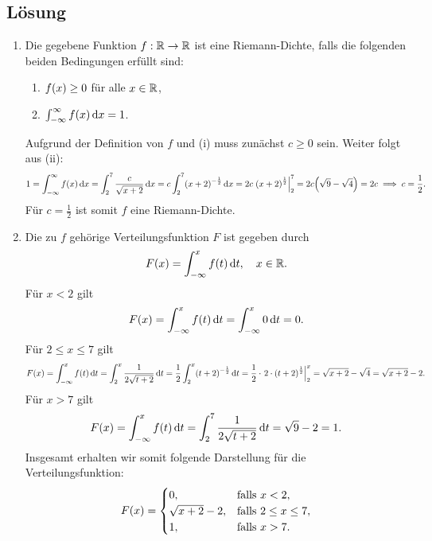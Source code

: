\documentclass{exercise}
\begin{document}
    \subsection*{Lösung}
    \begin{enumerate}
        \item Die gegebene Funktion \(f: \mathbb{R} \to \mathbb{R}\) ist eine Riemann-Dichte, falls die folgenden beiden Bedingungen erfüllt sind:
        \begin{enumerate}
            \item \(f\parentheses*{x} \ge 0\) für alle \(x \in \mathbb{R}\),
            \item \(\int_{-\infty}^\infty f\parentheses*{x}\d x = 1\).
        \end{enumerate}
        Aufgrund der Definition von \(f\) und (i) muss zunächst \(c \ge 0\) sein.
        Weiter folgt aus (ii):
        \[
            1 = \int_{-\infty}^\infty f\parentheses*{x}\d x = \int_2^7 \frac{c}{\sqrt{x + 2}}\d x = c\int_2^7 \parentheses*{x + 2}^{-\frac{1}{2}}\d x = 2c\left.\parentheses*{x + 2}^{\frac{1}{2}}\right|_2^7 = 2c\parentheses*{\sqrt{9} - \sqrt{4}} = 2c \implies c = \frac{1}{2}.
        \]
        Für \(c = \frac{1}{2}\) ist somit \(f\) eine Riemann-Dichte.
        \item Die zu \(f\) gehörige Verteilungsfunktion \(F\) ist gegeben durch
        \[
            F\parentheses*{x} = \int_{-\infty}^x f\parentheses*{t}\d t, \quad x \in \R.
        \]
        Für \(x < 2\) gilt
        \[
            F\parentheses*{x} = \int_{-\infty}^x f\parentheses*{t}\d t = \int_{-\infty}^x 0\d t = 0.
        \]
        Für \(2 \le x \le 7\) gilt
        \[
            F\parentheses*{x} = \int_{-\infty}^x f\parentheses*{t}\d t = \int_2^x \frac{1}{2\sqrt{t + 2}}\d t = \frac{1}{2}\int_2^x \parentheses*{t + 2}^{-\frac{1}{2}}\d t = \frac{1}{2} \cdot \left.2 \cdot \parentheses*{t + 2}^{\frac{1}{2}}\right|_2^x = \sqrt{x + 2} - \sqrt{4} = \sqrt{x + 2} - 2.
        \]
        Für \(x > 7\) gilt
        \[
            F\parentheses*{x} = \int_{-\infty}^x f\parentheses*{t}\d t = \int_2^7 \frac{1}{2\sqrt{t + 2}}\d t = \sqrt{9} - 2 = 1.
        \]
        Insgesamt erhalten wir somit folgende Darstellung für die Verteilungsfunktion:
        \[
            F\parentheses*{x} = \begin{cases}
                0, & \text{falls }x < 2,\\
                \sqrt{x + 2} - 2, & \text{falls }2 \le x \le 7,\\
                1, & \text{falls }x > 7.
            \end{cases}
\]
\end{enumerate}
\end{document}

